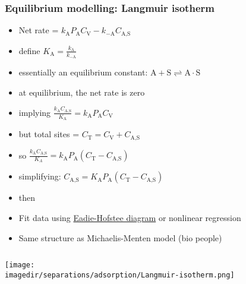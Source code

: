 \begin{frame}\frametitle{Equilibrium modelling: Langmuir isotherm}
	\vspace{-2cm}
	\begin{itemize}
		\item	Net rate = $k_\text{A} P_\text{A} C_\text{V} - k_{-\text{A}} C_\text{A,S}$  
		\item	define $K_\text{A} = \displaystyle\frac{k_\text{A}}{k_{-\text{A}}}$
		\item	essentially an equilibrium constant: $\text{A} + \text{S} \rightleftharpoons \text{A}\cdot \text{S}$		
		\item	at equilibrium, the net rate is zero 
		\pause
		\item	implying $\displaystyle\frac{k_\text{A}C_\text{A,S}}{K_\text{A}} = k_\text{A} P_\text{A} C_\text{V}$  
		\item	but total sites = $C_\text{T} = C_\text{V} + C_\text{A,S}$
		\item	so $\displaystyle\frac{k_\text{A}C_\text{A,S}}{K_A} = k_\text{A} P_\text{A} \left(C_\text{T} -  C_\text{A,S}\right)$  
		\item	simplifying: $C_\text{A,S} = K_\text{A} P_\text{A} \left(C_\text{T} -  C_\text{A,S}\right)$  
		\item	then 
		\item	Fit data using \href{http://en.wikipedia.org/wiki/Eadie\%E2\%80\%93Hofstee\_plot}{Eadie-Hofstee diagram} or nonlinear regression
		\item	Same structure as Michaelis-Menten model (bio people)
	\end{itemize}
	\vspace{-6.5cm}
	\begin{columns}[t]
			
			\begin{center}
				\texttt{[image: \\imagedir/separations/adsorption/Langmuir-isotherm.png]}
			\end{center}
	\end{columns}
\end{frame}

